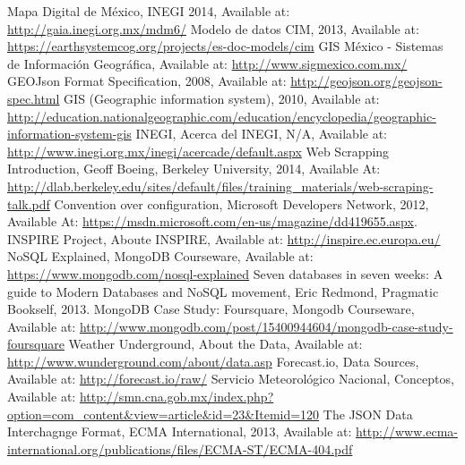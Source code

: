 \begin{thebibliography}{1}
		Mapa Digital de México, INEGI 2014, Available at: \url{http://gaia.inegi.org.mx/mdm6/}
	   Modelo de datos CIM, 2013, Available at: \url{https://earthsystemcog.org/projects/es-doc-models/cim}
		 GIS México - Sistemas de Información Geográfica, Available at: \url{http://www.sigmexico.com.mx/}
	     GEOJson Format Specification, 2008, Available at: \url{http://geojson.org/geojson-spec.html}
		 GIS (Geographic information system), 2010, Available at: \url{http://education.nationalgeographic.com/education/encyclopedia/geographic-information-system-gis}
		INEGI, Acerca del INEGI, N/A, Available at: \url{http://www.inegi.org.mx/inegi/acercade/default.aspx}
		Web Scrapping Introduction, Geoff Boeing, Berkeley University, 2014, Available At: \url{http://dlab.berkeley.edu/sites/default/files/training\_materials/web-scraping-talk.pdf}
		Convention over configuration, Microsoft Developers Network, 2012, Available At: \url{https://msdn.microsoft.com/en-us/magazine/dd419655.aspx}.
	    INSPIRE Project, Aboute INSPIRE, Available at: \url{http://inspire.ec.europa.eu/}
		NoSQL Explained, MongoDB Courseware, Available at: \url{https://www.mongodb.com/nosql-explained}
		Seven databases in seven weeks: A guide to Modern Databases and NoSQL movement, Eric Redmond, Pragmatic Bookself, 2013.
		MongoDB Case Study: Foursquare, Mongodb Courseware, Available at: \url{http://www.mongodb.com/post/15400944604/mongodb-case-study-foursquare}
		Weather Underground, About the Data, Available at: \url{http://www.wunderground.com/about/data.asp}
		Forecast.io, Data Sources, Available at: \url{http://forecast.io/raw/}
		Servicio Meteorológico Nacional, Conceptos, Available at: \url{http://smn.cna.gob.mx/index.php?option=com_content&view=article&id=23&Itemid=120}
    The JSON Data Interchagnge Format, ECMA International, 2013, Available at: \url{http://www.ecma-international.org/publications/files/ECMA-ST/ECMA-404.pdf}
\end{thebibliography}